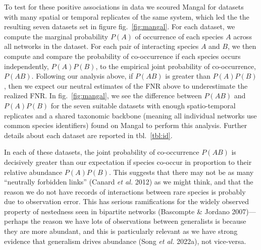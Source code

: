 \documentclass[11pt]{article}
\begin{document}
To test for these positive associations in data we scoured Mangal for
datasets with many spatial or temporal replicates of the same system,
which led the the resulting seven datasets set in figure
fig.~\ref{fig:mangal}. For each dataset, we compute the marginal
probability \(P(A)\) of occurrence of each species \(A\) across all
networks in the dataset. For each pair of interacting species \(A\) and
\(B\), we then compute and compare the probability of co-occurrence if
each species occurs independently, \(P(A)P(B)\), to the empirical joint
probability of co-occurrence, \(P(AB)\). Following our analysis above,
if \(P(AB)\) is greater than \(P(A)P(B)\), then we expect our neutral
estimates of the FNR above to underestimate the realized FNR. In
fig.~\ref{fig:mangal}, we see the difference between \(P(AB)\) and
\(P(A)P(B)\) for the seven suitable datasets with enough spatio-temporal
replicates and a shared taxonomic backbone (meaning all individual
networks use common species identifiers) found on Mangal to perform this
analysis. Further details about each dataset are reported in
tbl.~\ref{tbl:id}.

In each of these datasets, the joint probability of co-occurrence
\(P(AB)\) is decisively greater than our expectation if species co-occur
in proportion to their relative abundance \(P(A)P(B)\). This suggests
that there may not be as many ``neutrally forbidden links'' (Canard
\emph{et al.} 2012) as we might think, and that the reason we do not
have records of interactions between rare species is probably due to
observation error. This has serious ramifications for the widely
observed property of nestedness seen in bipartite networks (Bascompte \&
Jordano 2007)---perhaps the reason we have lots of observations between
generalists is because they are more abundant, and this is particularly
relevant as we have strong evidence that generalism drives abundance
(Song \emph{et al.} 2022a), not vice-versa.
\end{document}
